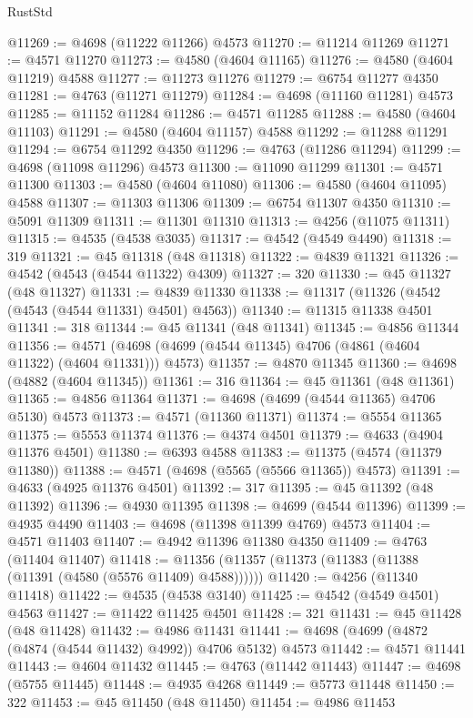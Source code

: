 \begin{lexlean}{RustStd}
\begin{coremodule}
@11269 := @4698 (@11222 @11266) @4573
@11270 := @11214 @11269
@11271 := @4571 @11270
@11273 := @4580 (@4604 @11165)
@11276 := @4580 (@4604 @11219) @4588
@11277 := @11273 @11276
@11279 := @6754 @11277 @4350
@11281 := @4763 (@11271 @11279)
@11284 := @4698 (@11160 @11281) @4573
@11285 := @11152 @11284
@11286 := @4571 @11285
@11288 := @4580 (@4604 @11103)
@11291 := @4580 (@4604 @11157) @4588
@11292 := @11288 @11291
@11294 := @6754 @11292 @4350
@11296 := @4763 (@11286 @11294)
@11299 := @4698 (@11098 @11296) @4573
@11300 := @11090 @11299
@11301 := @4571 @11300
@11303 := @4580 (@4604 @11080)
@11306 := @4580 (@4604 @11095) @4588
@11307 := @11303 @11306
@11309 := @6754 @11307 @4350
@11310 := @5091 @11309
@11311 := @11301 @11310
@11313 := @4256 (@11075 @11311)
@11315 := @4535 (@4538 @3035)
@11317 := @4542 (@4549 @4490)
@11318 := 319
@11321 := @45 @11318 (@48 @11318)
@11322 := @4839 @11321
@11326 := @4542 (@4543 (@4544 @11322) @4309)
@11327 := 320
@11330 := @45 @11327 (@48 @11327)
@11331 := @4839 @11330
@11338 := @11317 (@11326 (@4542 (@4543 (@4544 @11331) @4501) @4563))
@11340 := @11315 @11338 @4501
@11341 := 318
@11344 := @45 @11341 (@48 @11341)
@11345 := @4856 @11344
@11356 := @4571 (@4698 (@4699 (@4544 @11345) @4706 (@4861 (@4604 @11322) (@4604 @11331))) @4573)
@11357 := @4870 @11345
@11360 := @4698 (@4882 (@4604 @11345))
@11361 := 316
@11364 := @45 @11361 (@48 @11361)
@11365 := @4856 @11364
@11371 := @4698 (@4699 (@4544 @11365) @4706 @5130) @4573
@11373 := @4571 (@11360 @11371)
@11374 := @5554 @11365
@11375 := @5553 @11374
@11376 := @4374 @4501
@11379 := @4633 (@4904 @11376 @4501)
@11380 := @6393 @4588
@11383 := @11375 (@4574 (@11379 @11380))
@11388 := @4571 (@4698 (@5565 (@5566 @11365)) @4573)
@11391 := @4633 (@4925 @11376 @4501)
@11392 := 317
@11395 := @45 @11392 (@48 @11392)
@11396 := @4930 @11395
@11398 := @4699 (@4544 @11396)
@11399 := @4935 @4490
@11403 := @4698 (@11398 @11399 @4769) @4573
@11404 := @4571 @11403
@11407 := @4942 @11396 @11380 @4350
@11409 := @4763 (@11404 @11407)
@11418 := @11356 (@11357 (@11373 (@11383 (@11388 (@11391 (@4580 (@5576 @11409) @4588))))))
@11420 := @4256 (@11340 @11418)
@11422 := @4535 (@4538 @3140)
@11425 := @4542 (@4549 @4501) @4563
@11427 := @11422 @11425 @4501
@11428 := 321
@11431 := @45 @11428 (@48 @11428)
@11432 := @4986 @11431
@11441 := @4698 (@4699 (@4872 (@4874 (@4544 @11432) @4992)) @4706 @5132) @4573
@11442 := @4571 @11441
@11443 := @4604 @11432
@11445 := @4763 (@11442 @11443)
@11447 := @4698 (@5755 @11445)
@11448 := @4935 @4268
@11449 := @5773 @11448
@11450 := 322
@11453 := @45 @11450 (@48 @11450)
@11454 := @4986 @11453

\end{coremodule}
\end{lexlean}
